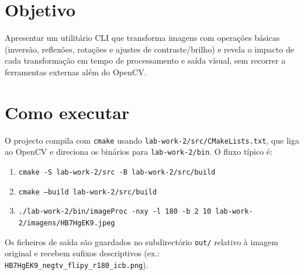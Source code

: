 \section{Objetivo}
Apresentar um utilitário CLI que transforma imagens com operações básicas (inversão, reflexões, rotações e ajustes de contraste/brilho) e revela o impacto de cada transformação em tempo de processamento e saída visual, sem recorrer a ferramentas externas além do OpenCV.

\section{Como executar}
O projecto compila com \texttt{cmake} usando \texttt{lab-work-2/src/CMakeLists.txt}, que liga ao OpenCV e direciona os binários para \texttt{lab-work-2/bin}. O fluxo típico é:
\begin{enumerate}
  \item \texttt{cmake -S lab-work-2/src -B lab-work-2/src/build}
  \item \texttt{cmake --build lab-work-2/src/build}
  \item \texttt{./lab-work-2/bin/imageProc -nxy -l 180 -b 2 10 lab-work-2/imagens/HB7HgEK9.jpeg}
\end{enumerate}
Os ficheiros de saída são guardados no subdirectório \texttt{out/} relativo à imagem original e recebem sufixos descriptivos (ex.: \texttt{HB7HgEK9_negtv_flipy_r180_icb.png}).

